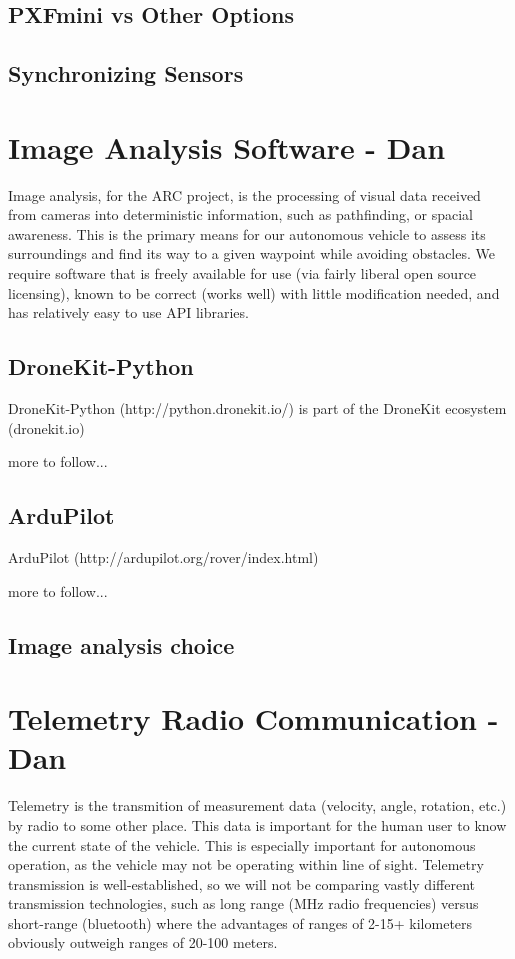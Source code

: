 \documentclass[compsoc,draftclsnofoot,onecolumn,10pt]{IEEEtran}
\begin{document}
\subsection{PXFmini vs Other Options}
\subsection{Synchronizing Sensors}


\section{Image Analysis Software - Dan}
Image analysis, for the ARC project, is the processing of visual data received
from cameras into deterministic information, such as pathfinding, or spacial
awareness. This is the primary means for our autonomous vehicle to assess its
surroundings and find its way to a given waypoint while avoiding obstacles. We
require software that is freely available for use (via fairly liberal open
source licensing), known to be correct (works well) with little modification
needed, and has relatively easy to use API libraries.

\subsection{DroneKit-Python}
DroneKit-Python (http://python.dronekit.io/) is part of the DroneKit ecosystem (dronekit.io)\par
more to follow...

\subsection{ArduPilot}
ArduPilot (http://ardupilot.org/rover/index.html)\par
more to follow...

\subsection{Image analysis choice}

\section{Telemetry Radio Communication - Dan}
Telemetry is the transmition of measurement data (velocity, angle, rotation, etc.)
by radio to some other place. This data is important for the human user to
know the current state of the vehicle. This is especially important for
autonomous operation, as the vehicle may not be operating within line of
sight. Telemetry transmission is well-established, so we will not be comparing
vastly different transmission technologies, such as long range (MHz radio frequencies)
versus short-range (bluetooth) where the advantages of ranges of 2-15+
kilometers obviously outweigh ranges of 20-100 meters.
\end{document}

